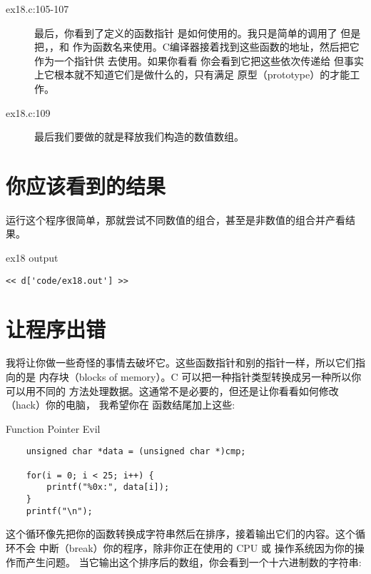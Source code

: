 \begin{description}
\item[ex18.c:105-107] 最后，你看到了定义的函数指针 是如何使用的。我只是简单的调用了  但是把，，和
    作为函数名来使用。C编译器接着找到这些函数的地址，然后把它作为一个指针供  去使用。如果你看看 你会看到它把这些依次传递给 但事实上它根本就不知道它们是做什么的，只有满足 原型（prototype）的才能工作。
\item[ex18.c:109] 最后我们要做的就是释放我们构造的数值数组。
\end{description}


\section{你应该看到的结果}

运行这个程序很简单，那就尝试不同数值的组合，甚至是非数值的组合并产看结果。

\begin{code}{ex18 output}
\begin{lstlisting}
<< d['code/ex18.out'] >>
\end{lstlisting}
\end{code}


\section{让程序出错}

我将让你做一些奇怪的事情去破坏它。这些函数指针和别的指针一样，所以它们指向的是
内存块（blocks of memory）。C 可以把一种指针类型转换成另一种所以你可以用不同的
方法处理数据。这通常不是必要的，但还是让你看看如何修改（hack）你的电脑，
我希望你在  函数结尾加上这些:

\begin{code}{Function Pointer Evil}
\begin{lstlisting}
    unsigned char *data = (unsigned char *)cmp;

    for(i = 0; i < 25; i++) {
        printf("%0x:", data[i]);
    }
    printf("\n");
\end{lstlisting}
\end{code}

这个循环像先把你的函数转换成字符串然后在排序，接着输出它们的内容。这个循环不会
中断（break）你的程序，除非你正在使用的 CPU 或 操作系统因为你的操作而产生问题。
当它输出这个排序后的数组，你会看到一个十六进制数的字符串:

